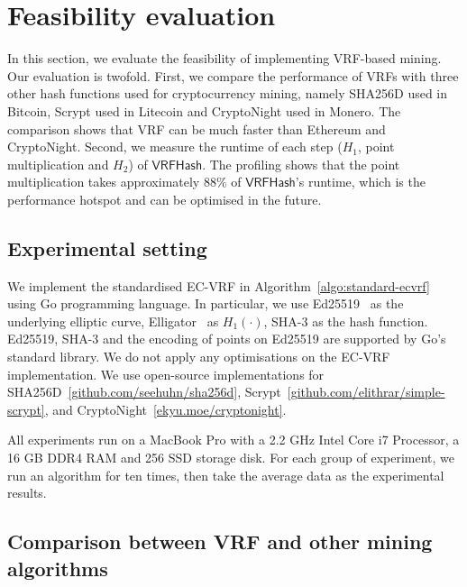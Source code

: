 \section{Feasibility evaluation}
\label{sec:feasibility}

In this section, we evaluate the feasibility of implementing VRF-based mining.
Our evaluation is twofold.
First, we compare the performance of VRFs with three other hash functions used for cryptocurrency mining, namely SHA256D used in Bitcoin, Scrypt used in Litecoin and CryptoNight used in Monero.
The comparison shows that VRF can be much faster than Ethereum and CryptoNight.
Second, we measure the runtime of each step ($H_1$, point multiplication and $H_2$) of $\mathsf{VRFHash}$.
The profiling shows that the point multiplication takes approximately 88\% of $\mathsf{VRFHash}$'s runtime, which is the performance hotspot and can be optimised in the future.

\subsection{Experimental setting}

We implement the standardised EC-VRF in Algorithm~\ref{algo:standard-ecvrf} using Go programming language.
In particular, we use Ed25519~\cite{bernstein2012high} as the underlying elliptic curve, Elligator~\cite{bernstein2013elligator} as $H_1(\cdot)$, SHA-3 as the hash function.
Ed25519, SHA-3 and the encoding of points on Ed25519 are supported by Go's standard library.
We do not apply any optimisations on the EC-VRF implementation.
We use open-source implementations for SHA256D~\ref{github.com/seehuhn/sha256d}, Scrypt~\ref{github.com/elithrar/simple-scrypt}, and CryptoNight~\ref{ekyu.moe/cryptonight}.

All experiments run on a MacBook Pro with a 2.2 GHz Intel Core i7 Processor, a 16 GB DDR4 RAM and 256 SSD storage disk.
For each group of experiment, we run an algorithm for ten times, then take the average data as the experimental results.




\subsection{Comparison between VRF and other mining algorithms}

